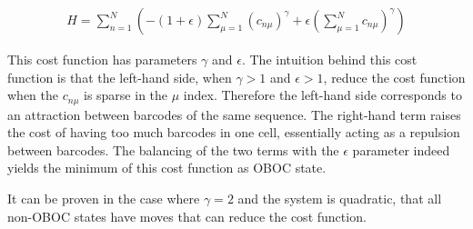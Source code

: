 \documentclass[../dissertation.tex]{subfiles}
\begin{document}
\begin{align}
    \label{eqn:cc-cost}
    H = \sum_{n = 1}^{N} \left(
    - \left( 1 + \epsilon \right) \sum_{\mu = 1}^{N} \left( c_{n\mu} \right)^\gamma
    + \epsilon  \left( \sum_{\mu = 1}^{N} c_{n\mu} \right)^\gamma
    \right)
\end{align}

This cost function has parameters $\gamma$ and $\epsilon$.
The intuition behind this cost function is that the left-hand side, when $\gamma > 1$ and $\epsilon > 1$, reduce the cost function when the $c_{n\mu}$ is sparse in the $\mu$ index.
Therefore the left-hand side corresponds to an attraction between barcodes of the same sequence.
The right-hand term raises the cost of having too much barcodes in one cell, essentially acting as a repulsion between barcodes.
The balancing of the two terms with the $\epsilon$ parameter indeed yields the minimum of this cost function as OBOC state.

It can be proven in the case where $\gamma = 2$ and the system is quadratic, that all non-OBOC states have moves that can reduce the cost function.
\end{document}
